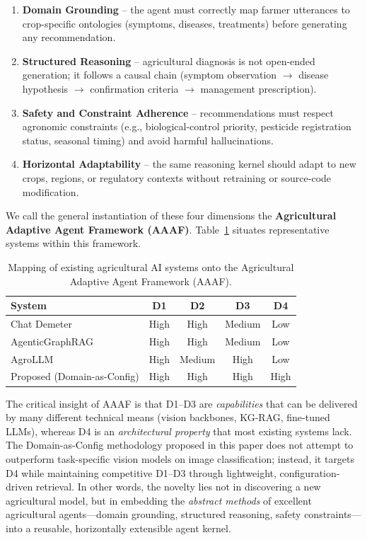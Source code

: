 \begin{enumerate}[label=\textbf{D\arabic*:},leftmargin=*]
    \item \textbf{Domain Grounding} -- the agent must correctly map farmer utterances to crop-specific ontologies (symptoms, diseases, treatments) before generating any recommendation.
    \item \textbf{Structured Reasoning} -- agricultural diagnosis is not open-ended generation; it follows a causal chain (symptom observation $\rightarrow$ disease hypothesis $\rightarrow$ confirmation criteria $\rightarrow$ management prescription).
    \item \textbf{Safety and Constraint Adherence} -- recommendations must respect agronomic constraints (e.g., biological-control priority, pesticide registration status, seasonal timing) and avoid harmful hallucinations.
    \item \textbf{Horizontal Adaptability} -- the same reasoning kernel should adapt to new crops, regions, or regulatory contexts without retraining or source-code modification.
\end{enumerate}

We call the general instantiation of these four dimensions the \textbf{Agricultural Adaptive Agent Framework (AAAF)}. Table~\ref{tab:aaaf_comparison} situates representative systems within this framework.

\begin{table}[htbp]
\centering
\caption{Mapping of existing agricultural AI systems onto the Agricultural Adaptive Agent Framework (AAAF).}
\label{tab:aaaf_comparison}
\begin{tabular}{p{2.8cm}cccc}
\hline
\textbf{System} & \textbf{D1} & \textbf{D2} & \textbf{D3} & \textbf{D4} \\
\hline
Chat Demeter \cite{chatdemeter2025} & High & High & Medium & Low \\
AgenticGraphRAG \cite{agenticgraphrag2025} & High & High & Medium & Low \\
AgroLLM \cite{samuel2025agrollm} & High & Medium & High & Low \\
Proposed (Domain-as-Config) & High & High & High & High \\
\hline
\end{tabular}
\end{table}

The critical insight of AAAF is that D1--D3 are \textit{capabilities} that can be delivered by many different technical means (vision backbones, KG-RAG, fine-tuned LLMs), whereas D4 is an \textit{architectural property} that most existing systems lack. The Domain-as-Config methodology proposed in this paper does not attempt to outperform task-specific vision models on image classification; instead, it targets D4 while maintaining competitive D1--D3 through lightweight, configuration-driven retrieval. In other words, the novelty lies not in discovering a new agricultural model, but in embedding the \textit{abstract methods} of excellent agricultural agents---domain grounding, structured reasoning, safety constraints---into a reusable, horizontally extensible agent kernel.
